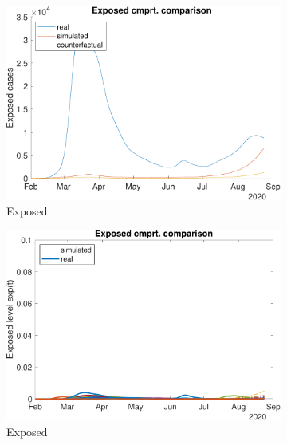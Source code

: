 \begin{figure}[hbtp]
     \centering
     \begin{subfigure}[b]{.45\linewidth}
         \centering
         \includegraphics[width=\linewidth]{img/210907_221615_combined_wave1/figures/COMP_exp}
         \caption{Exposed}
         \label{fig:compAggrCombWave1Exp}
     \end{subfigure}
     \hfill
     \begin{subfigure}[b]{.45\linewidth}
         \centering
         \includegraphics[width=\linewidth]{img/210907_221615_combined_wave1/figures/SEIR_e_sim-vs-real}
         \caption{Exposed}
         \label{fig:compCombWave1Exp}
     \end{subfigure}
     \newline
     \begin{subfigure}[b]{.45\linewidth}

\end{subfigure}
\end{figure}
